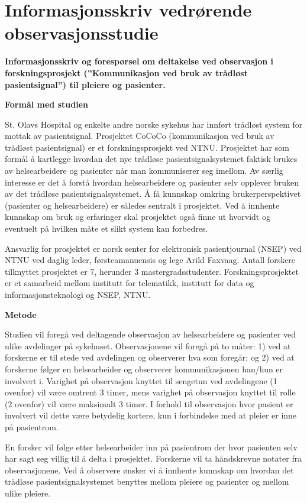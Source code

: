 \chapter{Informasjonsskriv vedrørende observasjonsstudie}
\label{chp:appendix_informasjon_observasjon}

\textbf{Informasjonsskriv og forespørsel om deltakelse ved observasjon i forskningsprosjekt (”Kommunikasjon ved bruk av trådløst pasientsignal”) til pleiere og pasienter. } 

\noindent
\textbf{Formål med studien}

\noindent
St. Olavs Hospital og enkelte andre norske sykehus har innført trådløst system for mottak av pasientsignal. Prosjektet CoCoCo (kommunikasjon ved bruk av trådløst pasientsignal) er et forskningsprosjekt ved NTNU. Prosjektet har som formål å kartlegge hvordan det nye trådløse pasientsignalsystemet faktisk brukes av helsearbeidere og pasienter når man kommuniserer seg imellom. Av særlig interesse er det å forstå hvordan helsearbeidere og pasienter selv opplever bruken av det trådløse pasientsignalsystemet. Å få kunnskap omkring brukerperspektivet (pasienter og helsearbeidere) er således sentralt i prosjektet. Ved å innhente kunnskap om bruk og erfaringer skal prosjektet også finne ut hvorvidt og eventuelt på hvilken måte et slikt system kan forbedres.

\noindent
Ansvarlig for prosjektet er norsk senter for elektronisk pasientjournal (NSEP) ved NTNU ved daglig leder, førsteamanuensis og lege Arild Faxvaag. Antall forskere tilknyttet prosjektet er 7, herunder 3 mastergradsstudenter. Forskningsprosjektet er et samarbeid mellom institutt for telematikk, institutt for data og informasjonsteknologi og NSEP, NTNU. 

\noindent
\textbf{Metode}

\noindent
Studien vil foregå ved deltagende observasjon av helsearbeidere og pasienter ved ulike avdelinger på sykehuset. Observasjonene vil foregå på to måter: 1) ved at forskerne er til stede ved avdelingen og observerer hva som foregår; og 2) ved at forskerne følger en helsearbeider og observerer kommunikasjonen han/hun er involvert i. Varighet på observasjon knyttet til sengetun ved avdelingene (1 ovenfor) vil være omtrent 3 timer, mens varighet på observasjon knyttet til rolle (2 ovenfor) vil være maksimalt 3 timer. I forhold til observasjon hvor pasient er involvert vil dette være betydelig kortere, kun i forbindelse med at pleier er inne på pasientrom.

\noindent
En forsker vil følge etter helsearbeider inn på pasientrom der hvor pasienten selv har sagt seg villig til å delta i prosjektet. Forskerne vil ta håndskrevne notater fra observasjonene. Ved å observere ønsker vi å innhente kunnskap om hvordan det trådløse pasientsignalsystemet benyttes mellom pleiere og pasienter og mellom ulike pleiere.


